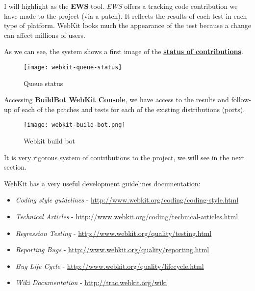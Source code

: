 \par I will highlight as the \textbf{EWS} tool. \textit{EWS} offers a tracking code contribution we have made to the project (via a patch). It reflects the results of each test in each type of platform. WebKit looks much the appearance of the test because a change can affect millions of users.

\par As we can see, the system shows a first image of the \textbf {\href{http://webkit-commit-queue.appspot.com/}{status of contributions}}.

\begin{figure}[htp]
    \centering
    \texttt{[image: webkit-queue-status]}
    \caption{Queue status}
    \label{queue-status}
\end{figure}

\par Accessing   \textbf {\href{http://build.webkit.org/console}{BuildBot WebKit Console}}, we have access to the results and follow-up of each of the patches and tests for each of the existing distributions (ports).

\begin{figure}[htp]
    \centering
    \texttt{[image: webkit-build-bot.png]}
    \caption{Webkit build bot}
    \label{build-bot}
\end{figure}

\par It is very rigorous system of contributions to the project, we will see in the next section.

\par WebKit has a very useful development guidelines documentation:

\begin{itemize}
	\item \textit{Coding style guidelines} - \url{http://www.webkit.org/coding/coding-style.html}
	\item \textit{Technical Articles} - \url{http://www.webkit.org/coding/technical-articles.html}
	\item \textit{Regression Testing} - \url{http://www.webkit.org/quality/testing.html}
	\item \textit{Reporting Bugs} - \url{http://www.webkit.org/quality/reporting.html}
	\item \textit{Bug Life Cycle} - \url{http://www.webkit.org/quality/lifecycle.html}
	\item \textit{Wiki Documentation} - \url{http://trac.webkit.org/wiki}
\end{itemize}

